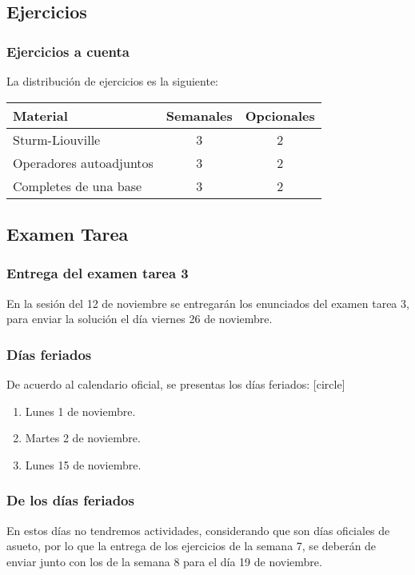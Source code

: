 \documentclass[12pt]{beamer}
\begin{document}
\subsection{Ejercicios}

\begin{frame}
\frametitle{Ejercicios a cuenta}
La distribución de ejercicios es la siguiente:
\pause
\begin{table}
\centering
\begin{tabular}{l c c}
Material & Semanales & Opcionales \\ \hline
Sturm-Liouville & 3 & 2 \\ \hline
Operadores autoadjuntos & 3 & 2 \\ \hline
Completes de una base & 3 & 2 \\ \hline    
\end{tabular}
\end{table}
\end{frame}

\subsection{Examen Tarea}

\begin{frame}
\frametitle{Entrega del examen tarea 3}
En la sesión del 12 de noviembre se entregarán los enunciados del examen tarea 3, \pause para enviar la solución el día viernes 26 de noviembre.
\end{frame}
\begin{frame}
\frametitle{Días feriados}
De acuerdo al calendario oficial, se presentas los días feriados:
\pause
{}
[circle]
\begin{enumerate}[<+->]
\item Lunes 1 de noviembre.
\item Martes 2 de noviembre.
\item Lunes 15 de noviembre.
\end{enumerate}
\end{frame}
\begin{frame}
\frametitle{De los días feriados}
En estos días no tendremos actividades, considerando que son días oficiales de asueto, por lo que la entrega de los ejercicios de la semana 7, se deberán de enviar junto con los de la semana 8 para el día 19 de noviembre.
\end{frame}
\end{document}
